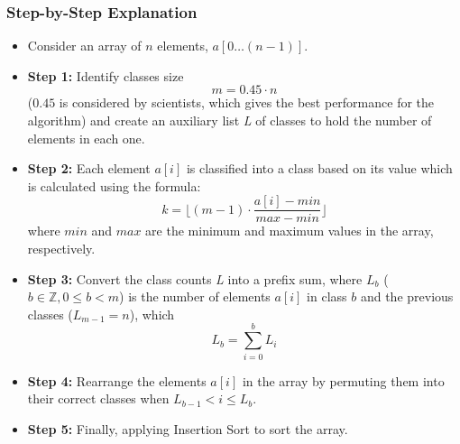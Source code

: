     \subsubsection{Step-by-Step Explanation}
        \begin{itemize}
            \item Consider an array of $n$ elements, $a[0\ldots (n - 1)]$.
            \item \textbf{Step 1:} Identify classes size $$m = 0.45 \cdot n$$ ($0.45$ is considered by scientists, which gives the best performance for the algorithm) and create an auxiliary list \textit{L} of classes to hold the number of elements in each one.
            \item \textbf{Step 2:} Each element $a[i]$ is classified into a class based on its value which is calculated using the formula: $$k = \lfloor (m - 1) \cdot \dfrac{a[i] - min}{max - min} \rfloor$$ where $min$ and $max$ are the minimum and maximum values in the array, respectively.
            \item \textbf{Step 3:} Convert the class counts \textit{L} into a prefix sum, where $L_b$ ($b \in \mathbb{Z}, 0 \le b < m$) is the number of elements $a[i]$ in class $b$ and the previous classes ($L_{m - 1} = n$), which $$L_b = \sum_{i=0}^{b} L_i$$
            \item \textbf{Step 4:} Rearrange the elements $a[i]$ in the array by permuting them into their correct classes when $L_{b - 1} < i \le L_b$.
            \item \textbf{Step 5:} Finally, applying Insertion Sort to sort the array.
        \end{itemize}

